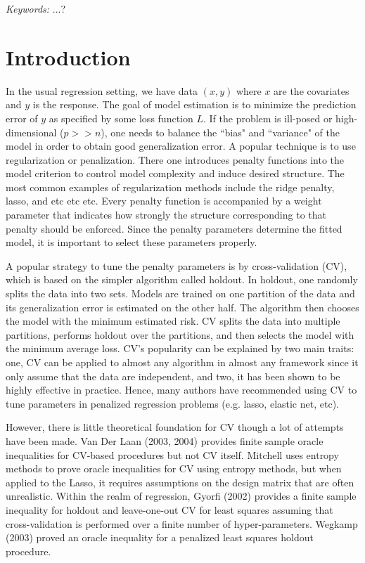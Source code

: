 \documentclass[12pt]{article}
\begin{document}
\noindent%
{\it Keywords:}  ...?
\vfill

\newpage
{} %
\section{Introduction}

In the usual regression setting, we have data $(x,y)$ where $x$ are the covariates and $y$ is the response. The goal of model estimation is to minimize the prediction error of $y$ as specified by some loss function $L$. If the problem is ill-posed or high-dimensional ($p >> n$), one needs to balance the ``bias" and ``variance" of the model in order to obtain good generalization error. A popular technique is to use regularization or penalization. There one introduces penalty functions into the model criterion to control model complexity and induce desired structure. The most common examples of regularization methods include the ridge penalty, lasso, and etc etc etc. Every penalty function is accompanied by a weight parameter that indicates how strongly the structure corresponding to that penalty should be enforced. Since the penalty parameters determine the fitted model, it is important to select these parameters properly.

A popular strategy to tune the penalty parameters is by cross-validation (CV), which is based on the simpler algorithm called holdout. In holdout, one randomly splits the data into two sets. Models are trained on one partition of the data and its generalization error is estimated on the other half. The algorithm then chooses the model with the minimum estimated risk. CV splits the data into multiple partitions, performs holdout over the partitions, and then selects the model with the minimum average loss. CV's popularity can be explained by two main traits: one, CV can be applied to almost any algorithm in almost any framework since it only assume that the data are independent, and two, it has been shown to be highly effective in practice. Hence, many authors have recommended using CV to tune parameters in penalized regression problems (e.g. lasso, elastic net, etc).

However, there is little theoretical foundation for CV though a lot of attempts have been made. Van Der Laan (2003, 2004) provides finite sample oracle inequalities for CV-based procedures but not CV itself. Mitchell uses entropy methods to prove oracle inequalities for CV using entropy methods, but when applied to the Lasso, it requires assumptions on the design matrix that are often unrealistic. Within the realm of regression, Gyorfi (2002) provides a finite sample inequality for holdout and leave-one-out CV for least squares assuming that cross-validation is performed over a finite number of hyper-parameters. Wegkamp (2003) proved an oracle inequality for a penalized least squares holdout procedure. 
\end{document}
